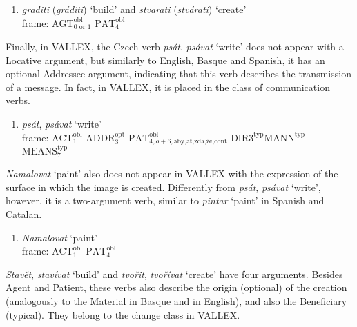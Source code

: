 \documentclass[english]{textolivre}
\begin{document}
\begin{enumerate}[label=(\arabic*),resume]
\item \label{itm38}  \textit{graditi} (\textit{gráditi}) ‘build’ and \textit{stvarati} (\textit{stvárati}) ‘create’\\
frame: $\text{AGT}^{\text{obl}}_{0\text{\_or\_}1}$
$\text{PAT}^{\text{obl}}_{4}$
\end{enumerate}

Finally, in VALLEX, the Czech verb \textit{psát}, \textit{psávat} ‘write’ does not appear with a Locative argument, but similarly to English, Basque and Spanish, it has an optional Addressee argument, indicating that this verb describes the transmission of a message. In fact, in VALLEX, it is placed in the class of communication verbs.

\begin{enumerate}[label=(\arabic*), resume]
\item \label{itm39} \textit{psát}, \textit{psávat} ‘write’ \\
frame: $\text{ACT}^{\text{obl}}_{1}$
$\text{ADDR}^{\text{opt}}_{3}$
$\text{PAT}^{\text{obl}}_{4,o+6,\text{aby,ať,zda,že,cont}}$
$\text{DIR3}^{\text{typ}} \text{MANN}^{\text{typ}}$ 
$\text{MEANS}^{\text{typ}}_{7}$
\end{enumerate}
    
\textit{Namalovat} ‘paint’ also does not appear in VALLEX with the expression of the surface in which the image is created. Differently from \textit{psát}, \textit{psávat} ‘write’, however, it is a two-argument verb, similar to \textit{pintar} ‘paint’ in Spanish and Catalan.

\begin{enumerate}[label=(\arabic*),resume]
\item \label{itm40}\textit{Namalovat} ‘paint’ \\
frame: $\text{ACT}^{\text{obl}}_{1}$
$\text{PAT}^{\text{obl}}_{4}$
\end{enumerate}

\textit{Stavět}, \textit{stavívat} ‘build’ and \textit{tvořit}, \textit{tvořívat} ‘create’ have four arguments. Besides Agent and Patient, these verbs also describe the origin (optional) of the creation (analogously to the Material in Basque and in English), and also the Beneficiary (typical). They belong to the change class in VALLEX.
\end{document}
